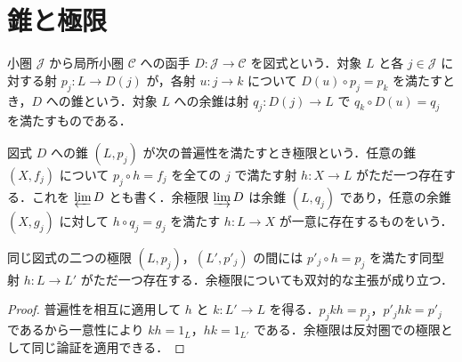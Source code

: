 \section{錐と極限}
\begin{defn}[図式と錐]
小圏 $\mathcal J$ から局所小圏 $\mathcal C$ への函手 $D:\mathcal J\to\mathcal C$ を図式という．対象 $L$ と各 $j\in\mathcal J$ に対する射 $p_j:L\to D(j)$ が，各射 $u:j\to k$ について $D(u)\circ p_j=p_k$ を満たすとき，$D$ への錐という．対象 $L$ への余錐は射 $q_j:D(j)\to L$ で $q_k\circ D(u)=q_j$ を満たすものである．
\end{defn}
\begin{defn}[極限と余極限]
図式 $D$ への錐 $(L,p_j)$ が次の普遍性を満たすとき極限という．任意の錐 $(X,f_j)$ について $p_j\circ h=f_j$ を全ての $j$ で満たす射 $h:X\to L$ がただ一つ存在する．これを $\varprojlim D$ とも書く．余極限 $\varinjlim D$ は余錐 $(L,q_j)$ であり，任意の余錐 $(X,g_j)$ に対して $h\circ q_j=g_j$ を満たす $h:L\to X$ が一意に存在するものをいう．
\end{defn}
\begin{prop}[極限の一意性]
同じ図式の二つの極限 $(L,p_j)$，$(L',p'_j)$ の間には $p'_j\circ h=p_j$ を満たす同型射 $h:L\to L'$ がただ一つ存在する．余極限についても双対的な主張が成り立つ．
\end{prop}
\begin{proof}
普遍性を相互に適用して $h$ と $k:L'\to L$ を得る．$p_jkh=p_j$，$p'_jhk=p'_j$ であるから一意性により $kh=1_L$，$hk=1_{L'}$ である．余極限は反対圏での極限として同じ論証を適用できる．
\end{proof}
